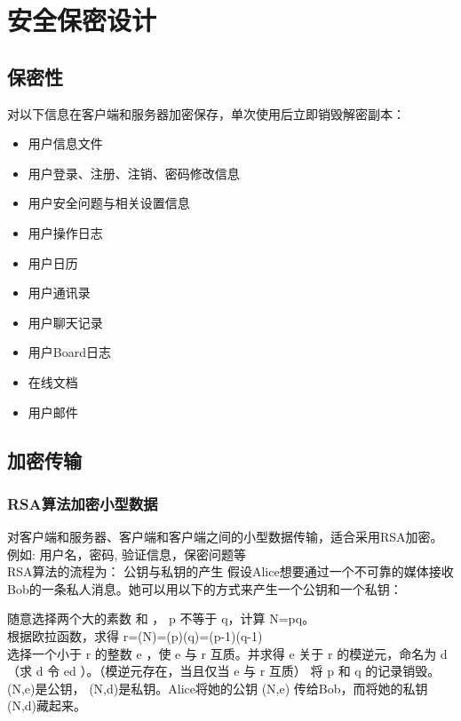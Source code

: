 \chapter{安全保密设计}
    \section{保密性}
    对以下信息在客户端和服务器加密保存，单次使用后立即销毁解密副本：
    \begin{itemize}
        \item 用户信息文件
        \item 用户登录、注册、注销、密码修改信息
        \item 用户安全问题与相关设置信息
        \item 用户操作日志
        \item 用户日历
        \item 用户通讯录
        \item 用户聊天记录
        \item 用户Board日志
        \item 在线文档
        \item 用户邮件
    \end{itemize}
    \section{加密传输}
    \subsection{RSA算法加密小型数据}
    对客户端和服务器、客户端和客户端之间的小型数据传输，适合采用RSA加密。\\
    例如: 用户名，密码, 验证信息，保密问题等\\
    RSA算法的流程为：
    公钥与私钥的产生
假设Alice想要通过一个不可靠的媒体接收Bob的一条私人消息。她可以用以下的方式来产生一个公钥和一个私钥：

随意选择两个大的素数 {} 和 {}， {\displaystyle{}p} 不等于 {\displaystyle q}，计算 {\displaystyle N=pq}。\\
根据欧拉函数，求得 {\displaystyle r=\varphi (N)=\varphi (p)\varphi (q)=(p-1)(q-1)} \\
选择一个小于 {\displaystyle r} 的整数 {\displaystyle e} ，使 {\displaystyle e} 与 {\displaystyle r} 互质。并求得 {\displaystyle e} 关于 {\displaystyle r} 的模逆元，命名为 {\displaystyle d} （求 {\displaystyle d} 令 {\displaystyle ed} ）。（模逆元存在，当且仅当 {\displaystyle e} 与 {\displaystyle r} 互质）
将 {\displaystyle p} 和 {\displaystyle q} 的记录销毁。\\
{\displaystyle (N,e)}是公钥， {\displaystyle (N,d)}是私钥。Alice将她的公钥 {\displaystyle (N,e)} 传给Bob，而将她的私钥 {\displaystyle (N,d)}藏起来。

